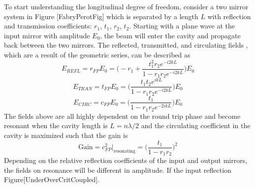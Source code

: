 		To start understanding the longitudinal degree of freedom, consider a two mirror system in Figure [FabryPerotFig] which is separated by a length $L$ with reflection and transmission coefficients: $r_1$, $t_1$, $r_2$, $t_2$.  Starting with a plane wave at the input mirror with amplitude $E_0$, the beam will enter the cavity and propagate back between the two mirrors.  The reflected, transmitted, and circulating fields \cite{Saulson}, which are a result of the geometric series, can be described as
		\begin{equation}\label{r_FP}
		E_{REFL} = r_{FP} E_0 = \bigg(-r_1 + \frac{t_1^2 r_2  e^{-i2kL}}{1-r_1 r_2 e^{-i2kL}} \bigg) E_0
		\end{equation}
		\begin{equation}\label{t_FP}
		E_{TRAN} = t_{FP} E_{0} = \bigg( \frac{t_1 t_2 e^{ikL}}{1-r_1 r_2 e^{-i2kL}}\bigg) E_0
		\end{equation}
		\begin{equation}\label{c_FP}
		E_{CIRC} = c_{FP} E_0 = \bigg(\frac{t_1}{1- r_1 r_2 e^{-2ikL}} \bigg) E_0
		\end{equation}
		The fields above are all highly dependent on the round trip phase and become resonant when the cavity length is $L = n \lambda / 2$ and the circulating coefficient in the cavity is maximized such that the gain is
		\begin{equation}
		\text{Gain} = c^2_{FP} \vert_{\text{resonating}} = \bigg( \frac{t_1}{1-r_1 r_2}\bigg)^2
		\end{equation}
		Depending on the relative reflection coefficients of the input and output mirrors, the fields on resonance will be different in amplitude.  If the input reflection  Figure[UnderOverCritCoupled].
		
